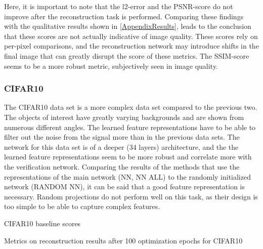 Here, it is important to note that the l2-error and the PSNR-score do not improve after the reconstruction task is performed.
Comparing these findings with the qualitative results shown in \cref{AppendixResults}, 
leads to the conclusion that these scores are not actually indicative of image quality.
These scores rely on per-pixel comparisons, and the reconstruction network may introduce shifts in the final image
that can greatly disrupt the score of these metrics.
The SSIM-score seems to be a more robust metric, subjectively seen in image quality.





\subsubsection{CIFAR10}

The CIFAR10 data set is a more complex data set compared to the previous two.
The objects of interest have greatly varying backgrounds and are shown from numerous different angles.
The learned feature representations have to be able to filter out the noise from the signal more than in
the previous data sets.
The network for this data set is of a deeper (34 layers) architecture, and the
the learned feature representations seem to be more robust and correlate more with the verification network.
Comparing the results of the methods that use the representations of the main network (NN, NN ALL)
to the randomly initialized network (RANDOM NN), it can be said that a good feature representation is necessary.
Random projections do not perform well on this task, as their design is too simple to be able to capture complex features.

\begin{table}[!htbp]
\label{tab:cifar10baseline}
\centering
\footnotesize
{}
\caption{CIFAR10 baseline scores}
\end{table}

\begin{table}[!htbp]
\label{tab:cifar10results}
\centering
\footnotesize
{}
\caption{Metrics on reconstruction results after 100 optimization epochs for CIFAR10}
\end{table}






